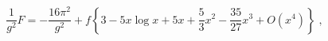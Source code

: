 \begin{equation}
\label{3-16}
\frac{1}{g^2}F = -\frac{16\pi^2}{g^2} + f\left\{
3-5x\log x +5x+\frac53 x^2 - \frac{35}{27} x^3 + O(x^4)\right\}\;,
\end{equation} 
